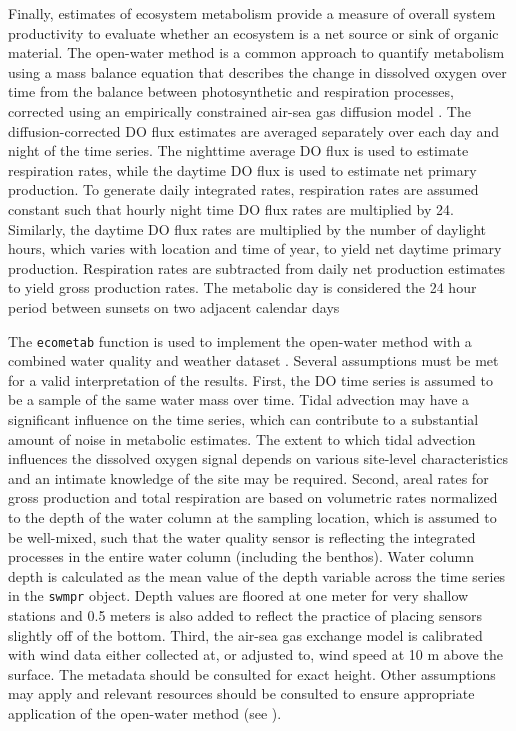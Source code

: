 \documentclass[10pt,letterpaper]{article}\usepackage[]{graphicx}\usepackage[]{color}
\begin{document}
Finally, estimates of ecosystem metabolism provide a measure of overall system productivity to evaluate whether an ecosystem is a net source or sink of organic material.  The open-water method \cite{Odum56} is a common approach to quantify metabolism using a mass balance equation that describes the change in dissolved oxygen over time from the balance between photosynthetic and respiration processes, corrected using an empirically constrained air-sea gas diffusion model \cite{Ro06,Thebault08}. The diffusion-corrected \gls{DO} flux estimates are averaged separately over each day and night of the time series. The nighttime average \gls{DO} flux is used to estimate respiration rates, while the daytime \gls{DO} flux is used to estimate net primary production. To generate daily integrated rates, respiration rates are assumed constant such that hourly night time \gls{DO} flux rates are multiplied by 24. Similarly, the daytime \gls{DO} flux rates are multiplied by the number of daylight hours, which varies with location and time of year, to yield net daytime primary production. Respiration rates are subtracted from daily net production estimates to yield gross production rates. The metabolic day is considered the 24 hour period between sunsets on two adjacent calendar days  

The \texttt{ecometab} function is used to implement the open-water method with a combined water quality and weather dataset \cite{Caffrey14}.  Several assumptions must be met for a valid interpretation of the results.  First, the \gls{DO} time series is assumed to be a sample of the same water mass over time.  Tidal advection may have a significant influence on the time series, which can contribute to a substantial amount of noise in metabolic estimates.  The extent to which tidal advection influences the dissolved oxygen signal depends on various site-level characteristics and an intimate knowledge of the site may be required.  Second, areal rates for gross production and total respiration are based on volumetric rates normalized to the depth of the water column at the sampling location, which is assumed to be well-mixed, such that the water quality sensor is reflecting the integrated processes in the entire water column (including the benthos).  Water column depth is calculated as the mean value of the depth variable across the time series in the \texttt{swmpr} object. Depth values are floored at one meter for very shallow stations and 0.5 meters is also added to reflect the practice of placing sensors slightly off of the bottom.  Third, the air-sea gas exchange model is calibrated with wind data either collected at, or adjusted to, wind speed at 10 m above the surface.  The metadata should be consulted for exact height. Other assumptions may apply and relevant resources should be consulted to ensure appropriate application of the open-water method (see \cite{Kemp12,Needoba12}).
\end{document}
